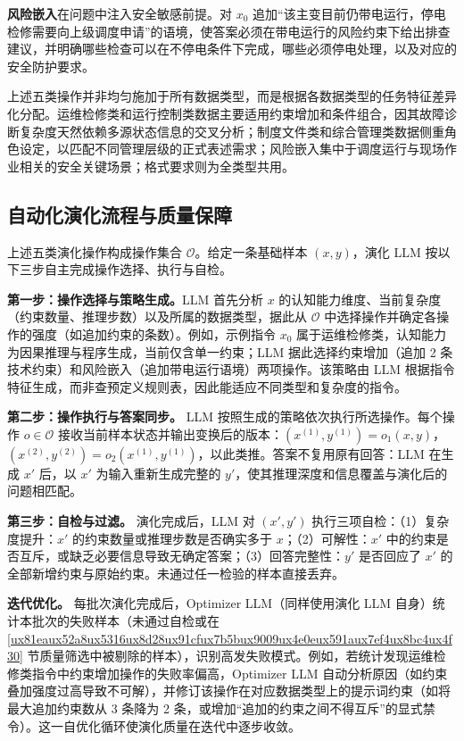 \documentclass[fontset=fandol,type=master,campus=shenzhen,etitleauto=true]{hithesisbook}
\begin{document}
\textbf{风险嵌入}在问题中注入安全敏感前提。对 $x_0$ 追加``该主变目前仍带电运行，停电检修需要向上级调度申请''的语境，使答案必须在带电运行的风险约束下给出排查建议，并明确哪些检查可以在不停电条件下完成，哪些必须停电处理，以及对应的安全防护要求。

上述五类操作并非均匀施加于所有数据类型，而是根据各数据类型的任务特征差异化分配。运维检修类和运行控制类数据主要适用约束增加和条件组合，因其故障诊断复杂度天然依赖多源状态信息的交叉分析；制度文件类和综合管理类数据侧重角色设定，以匹配不同管理层级的正式表述需求；风险嵌入集中于调度运行与现场作业相关的安全关键场景；格式要求则为全类型共用。

\subsection{自动化演化流程与质量保障}\label{ux4ebaux673aux534fux540cux5ba1ux6838ux673aux5236}

上述五类演化操作构成操作集合 $\mathcal{O}$。给定一条基础样本 $(x, y)$，演化 LLM 按以下三步自主完成操作选择、执行与自检。

\textbf{第一步：操作选择与策略生成。}LLM 首先分析 $x$ 的认知能力维度、当前复杂度（约束数量、推理步数）以及所属的数据类型，据此从 $\mathcal{O}$ 中选择操作并确定各操作的强度（如追加约束的条数）。例如，示例指令 $x_0$ 属于运维检修类，认知能力为因果推理与程序生成，当前仅含单一约束；LLM 据此选择约束增加（追加 2 条技术约束）和风险嵌入（追加带电运行语境）两项操作。该策略由 LLM 根据指令特征生成，而非查预定义规则表，因此能适应不同类型和复杂度的指令。

\textbf{第二步：操作执行与答案同步。} LLM 按照生成的策略依次执行所选操作。每个操作 $o \in \mathcal{O}$ 接收当前样本状态并输出变换后的版本：$(x^{(1)}, y^{(1)}) = o_1(x, y)$，$(x^{(2)}, y^{(2)}) = o_2(x^{(1)}, y^{(1)})$，以此类推。答案不复用原有回答：LLM 在生成 $x'$ 后，以 $x'$ 为输入重新生成完整的 $y'$，使其推理深度和信息覆盖与演化后的问题相匹配。

\textbf{第三步：自检与过滤。} 演化完成后，LLM 对 $(x', y')$ 执行三项自检：（1）复杂度提升：$x'$ 的约束数量或推理步数是否确实多于 $x$；（2）可解性：$x'$ 中的约束是否互斥，或缺乏必要信息导致无确定答案；（3）回答完整性：$y'$ 是否回应了 $x'$ 的全部新增约束与原始约束。未通过任一检验的样本直接丢弃。

\textbf{迭代优化。} 每批次演化完成后，Optimizer LLM（同样使用演化 LLM 自身）统计本批次的失败样本（未通过自检或在 \ref{ux81eaux52a8ux5316ux8d28ux91cfux7b5bux9009ux4e0eux591aux7ef4ux8bc4ux4f30} 节质量筛选中被剔除的样本），识别高发失败模式。例如，若统计发现运维检修类指令中约束增加操作的失败率偏高，Optimizer LLM 自动分析原因（如约束叠加强度过高导致不可解），并修订该操作在对应数据类型上的提示词约束（如将最大追加约束数从 3 条降为 2 条，或增加``追加的约束之间不得互斥''的显式禁令）。这一自优化循环使演化质量在迭代中逐步收敛。
\end{document}

